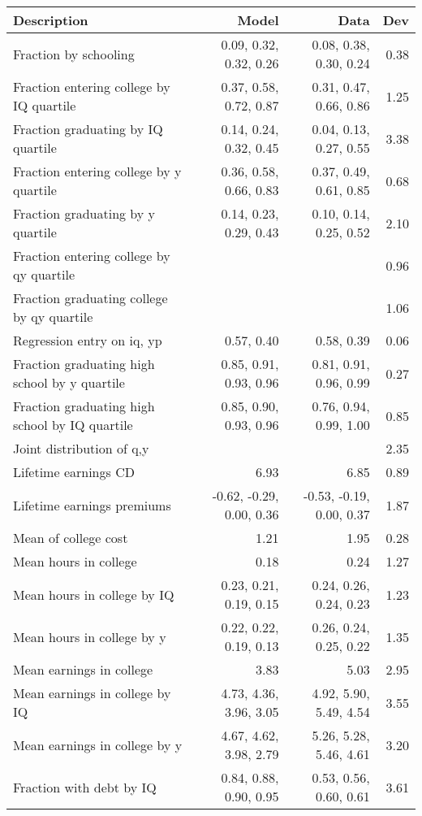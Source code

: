 \begin{tabular}{lrrr}
\hline
Description & Model  & Data  & Dev  \\ 
\hline
Fraction by schooling & 0.09, 0.32, 0.32, 0.26  & 0.08, 0.38, 0.30, 0.24  & 0.38  \\ 
Fraction entering college by IQ quartile & 0.37, 0.58, 0.72, 0.87  & 0.31, 0.47, 0.66, 0.86  & 1.25  \\ 
Fraction graduating by IQ quartile & 0.14, 0.24, 0.32, 0.45  & 0.04, 0.13, 0.27, 0.55  & 3.38  \\ 
Fraction entering college by y quartile & 0.36, 0.58, 0.66, 0.83  & 0.37, 0.49, 0.61, 0.85  & 0.68  \\ 
Fraction graduating by y quartile & 0.14, 0.23, 0.29, 0.43  & 0.10, 0.14, 0.25, 0.52  & 2.10  \\ 
Fraction entering college by qy quartile &   &   & 0.96  \\ 
Fraction graduating college by qy quartile &   &   & 1.06  \\ 
Regression entry on iq, yp & 0.57, 0.40  & 0.58, 0.39  & 0.06  \\ 
Fraction graduating high school by y quartile & 0.85, 0.91, 0.93, 0.96  & 0.81, 0.91, 0.96, 0.99  & 0.27  \\ 
Fraction graduating high school by IQ quartile & 0.85, 0.90, 0.93, 0.96  & 0.76, 0.94, 0.99, 1.00  & 0.85  \\ 
Joint distribution of q,y &   &   & 2.35  \\ 
Lifetime earnings CD & 6.93  & 6.85  & 0.89  \\ 
Lifetime earnings premiums & -0.62, -0.29, 0.00, 0.36  & -0.53, -0.19, 0.00, 0.37  & 1.87  \\ 
Mean of college cost & 1.21  & 1.95  & 0.28  \\ 
Mean hours in college & 0.18  & 0.24  & 1.27  \\ 
Mean hours in college by IQ & 0.23, 0.21, 0.19, 0.15  & 0.24, 0.26, 0.24, 0.23  & 1.23  \\ 
Mean hours in college by y & 0.22, 0.22, 0.19, 0.13  & 0.26, 0.24, 0.25, 0.22  & 1.35  \\ 
Mean earnings in college & 3.83  & 5.03  & 2.95  \\ 
Mean earnings in college by IQ & 4.73, 4.36, 3.96, 3.05  & 4.92, 5.90, 5.49, 4.54  & 3.55  \\ 
Mean earnings in college by y & 4.67, 4.62, 3.98, 2.79  & 5.26, 5.28, 5.46, 4.61  & 3.20  \\ 
Fraction with debt by IQ & 0.84, 0.88, 0.90, 0.95  & 0.53, 0.56, 0.60, 0.61  & 3.61  \\ 

\end{tabular}
